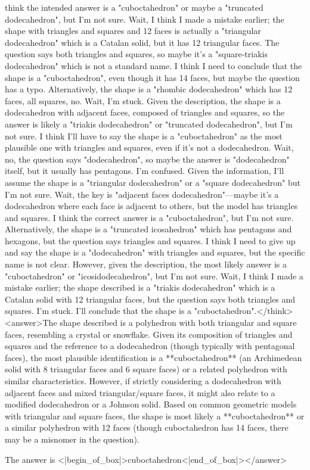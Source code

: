 think the intended answer is a "cuboctahedron" or maybe a "truncated dodecahedron", but I'm not sure. Wait, I think I made a mistake earlier; the shape with triangles and squares and 12 faces is actually a "triangular dodecahedron" which is a Catalan solid, but it has 12 triangular faces. The question says both triangles and squares, so maybe it's a "square-triakis dodecahedron" which is not a standard name. I think I need to conclude that the shape is a "cuboctahedron", even though it has 14 faces, but maybe the question has a typo. Alternatively, the shape is a "rhombic dodecahedron" which has 12 faces, all squares, no. Wait, I'm stuck. Given the description, the shape is a dodecahedron with adjacent faces, composed of triangles and squares, so the answer is likely a "triakis dodecahedron" or "truncated dodecahedron", but I'm not sure. I think I'll have to say the shape is a "cuboctahedron" as the most plausible one with triangles and squares, even if it's not a dodecahedron. Wait, no, the question says "dodecahedron", so maybe the answer is "dodecahedron" itself, but it usually has pentagons. I'm confused. Given the information, I'll assume the shape is a "triangular dodecahedron" or a "square dodecahedron" but I'm not sure. Wait, the key is "adjacent faces dodecahedron"—maybe it's a dodecahedron where each face is adjacent to others, but the model has triangles and squares. I think the correct answer is a "cuboctahedron", but I'm not sure. Alternatively, the shape is a "truncated icosahedron" which has pentagons and hexagons, but the question says triangles and squares. I think I need to give up and say the shape is a "dodecahedron" with triangles and squares, but the specific name is not clear. However, given the description, the most likely answer is a "cuboctahedron" or "icosidodecahedron", but I'm not sure. Wait, I think I made a mistake earlier; the shape described is a "triakis dodecahedron" which is a Catalan solid with 12 triangular faces, but the question says both triangles and squares. I'm stuck. I'll conclude that the shape is a "cuboctahedron".</think><answer>The shape described is a polyhedron with both triangular and square faces, resembling a crystal or snowflake. Given its composition of triangles and squares and the reference to a dodecahedron (though typically with pentagonal faces), the most plausible identification is a **cuboctahedron** (an Archimedean solid with 8 triangular faces and 6 square faces) or a related polyhedron with similar characteristics. However, if strictly considering a dodecahedron with adjacent faces and mixed triangular/square faces, it might also relate to a modified dodecahedron or a Johnson solid. Based on common geometric models with triangular and square faces, the shape is most likely a **cuboctahedron** or a similar polyhedron with 12 faces (though cuboctahedron has 14 faces, there may be a misnomer in the question).  

The answer is <|begin_of_box|>cuboctahedron<|end_of_box|></answer>